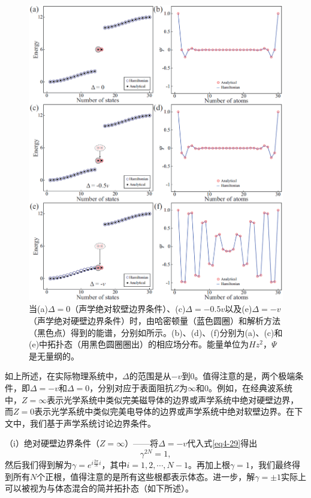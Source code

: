 \begin{figure}[h!]
    \centering
    \includegraphics[width=1\textwidth]{images/fig4-5.eps} 
    \caption{当(a)$\Delta = 0$（声学绝对软壁边界条件）、(c)$\Delta = -0.5v$以及(e)$\Delta = -v$（声学绝对硬壁边界条件）时，由哈密顿量（蓝色圆圈）和解析方法（黑色点）得到的能谱，分别如所示。(b)、(d)、(f)分别为(a)、(c)和(e)中拓扑态（用黑色圆圈圈出）的相应场分布。能量单位为$Hz^2$，$\Psi$是无量纲的。}
    \label{fig_4_5}
\end{figure} 

如上所述，在实际物理系统中，\(\Delta\)的范围是从\(-v\)到\(0\)。值得注意的是，两个极端条件，即\(\Delta = -v\)和\(\Delta = 0\)，分别对应于表面阻抗\(Z\)为\(\infty\)和\(0\)。例如，在经典波系统中，\(Z=\infty\)表示光学系统中类似完美磁导体的边界或声学系统中绝对硬壁边界，而\(Z = 0\)表示光学系统中类似完美电导体的边界或声学系统中绝对软壁边界。在下文中，我们基于声学系统讨论边界条件。

（i）绝对硬壁边界条件（\(Z=\infty\)）——将\(\Delta = -v\)代入式\ref{eq4-29}得出
\begin{equation}
    \gamma^{2N}=1,
\end{equation}
然后我们得到解为\(\gamma = e^{i\frac{2\pi}{N}i}\)，其中\(i = 1,2,\cdots,N - 1\)。再加上根\(\gamma = 1\)，我们最终得到所有\(N\)个正根，值得注意的是所有这些根都表示体态。进一步，解\(\gamma=\pm1\)实际上可以被视为与体态混合的简并拓扑态（如下所述）。

